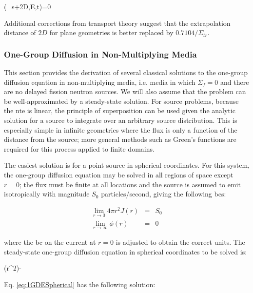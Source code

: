 \beq
\phi(_s+2D,E,t)=0
\eeq

Additional corrections from transport theory suggest that the extrapolation distance of \(2D\) for plane geometries is better replaced by \(0.7104/\Sigma_{tr}\). 

\subsubsection{One-Group Diffusion in Non-Multiplying Media}
\label{sec:NonMultiplyingDiffusion}
This section provides the derivation of several classical solutions to the one-group diffusion equation in non-multiplying media, i.e. media in which \(\Sigma_f=0\) and there are no delayed fission neutron sources. We will also assume that the problem can be well-approximated by a steady-state solution. For source problems, because the \gls{nte} is linear, the principle of superposition can be used given the analytic solution for a source to integrate over an arbitrary source distribution. This is especially simple in infinite geometries where the flux is only a function of the distance from the source; more general methods such as Green's functions are required for this process applied to finite domains.

\label{sec:1GDEPtSrcSpherical}
The easiest solution is for a point source in spherical coordinates. For this system, the one-group diffusion equation may be solved in all regions of space except \(r=0\); the flux must be finite at all locations and the source is assumed to emit isotropically with magnitude \(S_0\) particles/second, giving the following \glspl{bc}:

\begin{subequations}
\label{eq:1GDESphericalBCs}
\begin{eqnarray}
\lim_{r\rightarrow 0}4\pi r^2J(r)&=&S_0\\
\lim_{r\rightarrow\infty}\phi(r)&=&0
\end{eqnarray}
\end{subequations}

where the \gls{bc} on the current at \(r=0\) is adjusted to obtain the correct units. The steady-state one-group diffusion equation in spherical coordinates to be solved is:

\beq
\label{eq:1GDESpherical}
\left(r^2\right)-
\eeq

Eq. \eqref{eq:1GDESpherical} has the following solution:


